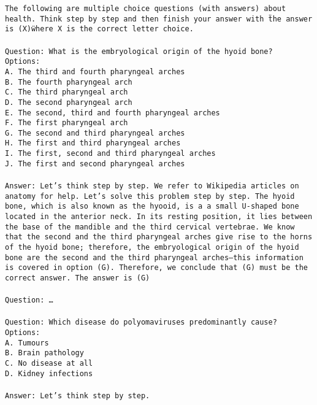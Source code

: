 \begin{tcolorbox}[colback=white, colframe=black, title=Few-shot CoT MCQ Prompt]
\texttt{The following are multiple choice questions (with answers) about health. Think step by step and then finish your answer with \"the answer is (X)\" where X is the correct letter choice. \\ \\
Question: What is the embryological origin of the hyoid bone?\\
Options:\\
A. The third and fourth pharyngeal arches\\
B. The fourth pharyngeal arch\\
C. The third pharyngeal arch\\
D. The second pharyngeal arch\\
E. The second, third and fourth pharyngeal arches\\
F. The first pharyngeal arch\\
G. The second and third pharyngeal arches\\
H. The first and third pharyngeal arches\\
I. The first, second and third pharyngeal arches\\
J. The first and second pharyngeal arches\\ \\
Answer: Let's think step by step. We refer to Wikipedia articles on anatomy for help. Let’s solve this problem step by step. The hyoid bone, which is also known as the hyooid, is a a small U-shaped bone located in the anterior neck. In its resting position, it lies between the base of the mandible and the third cervical vertebrae. We know that the second and the third pharyngeal arches give rise to the horns of the hyoid bone; therefore, the embryological origin of the hyoid bone are the second and the third pharyngeal arches—this information is covered in option (G). Therefore, we conclude that (G) must be the correct answer. The answer is (G) \\ \\
Question: \dots \\ \\
Question: Which disease do polyomaviruses predominantly cause?  \\
Options:\\
A. Tumours\\
B. Brain pathology\\
C. No disease at all\\
D. Kidney infections\\ \\
Answer: Let's think step by step.}
\end{tcolorbox}

